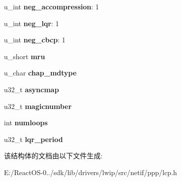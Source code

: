 \begin{DoxyCompactItemize}
\mbox{\label{structlcp__options_a47ba4cd92bc62fda00790e66419a7158}} 
u\+\_\+int {\bfseries neg\+\_\+accompression}\+: 1
\item 
\mbox{\label{structlcp__options_a9923a74a2b9256da00851cf0b2129391}} 
u\+\_\+int {\bfseries neg\+\_\+lqr}\+: 1
\item 
\mbox{\label{structlcp__options_aee4d5228984f75b4f9c0227c6d060477}} 
u\+\_\+int {\bfseries neg\+\_\+cbcp}\+: 1
\item 
\mbox{\label{structlcp__options_a9def2be8fea49c66d12af1a60dbd09dd}} 
u\+\_\+short {\bfseries mru}
\item 
\mbox{\label{structlcp__options_aad8812bc646bf71946e7a2dbae0e21d5}} 
u\+\_\+char {\bfseries chap\+\_\+mdtype}
\item 
\mbox{\label{structlcp__options_aa150f919421ecad35729d3ae28312b0b}} 
u32\+\_\+t {\bfseries asyncmap}
\item 
\mbox{\label{structlcp__options_a6943ceaaf565256dc8e0271c3d6d6ed9}} 
u32\+\_\+t {\bfseries magicnumber}
\item 
\mbox{\label{structlcp__options_a2dc6fa9a49ce366d061d21e05df8eb66}} 
int {\bfseries numloops}
\item 
\mbox{\label{structlcp__options_ab9bf0873de2a826119d80238c823934e}} 
u32\+\_\+t {\bfseries lqr\+\_\+period}
\end{DoxyCompactItemize}


该结构体的文档由以下文件生成\+:\begin{DoxyCompactItemize}
\item 
E\+:/\+React\+O\+S-\/0../sdk/lib/drivers/lwip/src/netif/ppp/lcp.\+h\end{DoxyCompactItemize}
